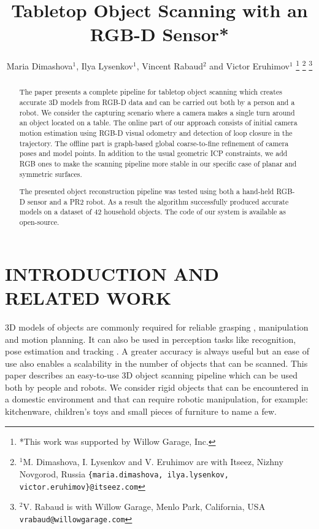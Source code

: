 \documentclass[letterpaper, 10 pt, conference]{ieeeconf}  %
\title{\LARGE \bf
Tabletop Object Scanning with an RGB-D Sensor*
}
\author{Maria Dimashova$^{1}$, Ilya Lysenkov$^{1}$, Vincent Rabaud$^{2}$ and Victor Eruhimov$^{1}$
\thanks{*This work was supported by Willow Garage, Inc.}%
\thanks{$^{1}$M. Dimashova, I. Lysenkov and V. Eruhimov are with Itseez, Nizhny Novgorod, Russia
        {\tt\small \{maria.dimashova, ilya.lysenkov, victor.eruhimov\}@itseez.com}}%
\thanks{$^{2}$V. Rabaud is with Willow Garage, Menlo Park, California, USA {\tt\small vrabaud@willowgarage.com}}%
}
\begin{document}
\maketitle
\thispagestyle{empty}
\pagestyle{empty}


\begin{abstract}
The paper presents a complete pipeline for tabletop object scanning
which creates accurate 3D models from RGB-D data and can be carried out both by a person
and a robot. We consider the capturing scenario where a camera makes
a single turn around an object located on a table. The online part of our approach consists 
of initial camera motion estimation using RGB-D visual
odometry and detection of loop closure in the trajectory. The offline part
is graph-based global coarse-to-fine refinement of camera poses and model points.
In addition to the usual geometric ICP constraints, we add
RGB ones to make the scanning pipeline more stable in our specific case 
of planar and symmetric surfaces. 

The presented object reconstruction pipeline was tested using both a hand-held RGB-D sensor and a PR2 robot.
As a result the algorithm successfully produced accurate models on a dataset of 42 household objects.
The code of our system is available as open-source.

\end{abstract}


\section{INTRODUCTION AND RELATED WORK}

3D models of objects are commonly required for reliable grasping \cite{miller2004graspit, sahbani2012overview},
manipulation and motion planning. It can also be used in perception tasks like recognition, pose estimation and tracking \cite{klank2009real, hinterstoisser2012accv}.
A greater accuracy is always useful but an ease of use also enables a scalability
in the number of objects that can be scanned.
This paper describes an easy-to-use 3D object scanning pipeline
which can be used both by people and robots.
We consider rigid objects that can be encountered
in a domestic environment and that can require robotic manipulation, for example:
kitchenware, children's toys and small pieces of furniture to name a few.
\end{document}
